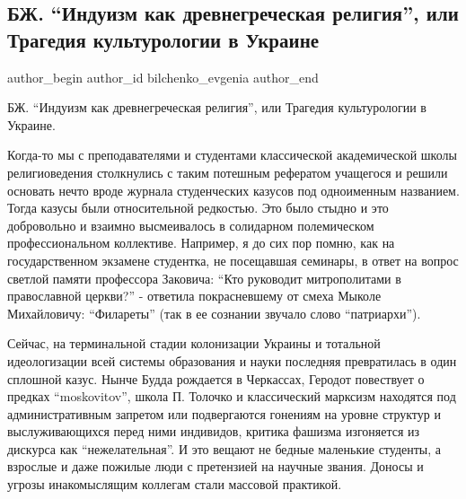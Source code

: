  
 
 
 
 
 
\subsection{БЖ. \enquote{Индуизм как древнегреческая религия}, или Трагедия культурологии в Украине}
\label{sec:28_12_2020.fb.bilchenko_evgenia.1.kulturologia_ukraina_tragedia}
\ifcmt
 author_begin
   author_id bilchenko_evgenia
 author_end
\fi

БЖ. \enquote{Индуизм как древнегреческая религия}, или Трагедия культурологии в Украине.

Когда-то мы с преподавателями и студентами классической академической школы
религиоведения столкнулись с таким потешным рефератом учащегося и решили
основать нечто вроде журнала студенческих казусов под одноименным названием.
Тогда казусы были относительной редкостью. Это было стыдно и это добровольно и
взаимно высмеивалось в солидарном полемическом профессиональном коллективе.
Например, я до сих пор помню, как на государственном экзамене студентка, не
посещавшая семинары, в ответ на вопрос светлой памяти профессора Заковича:
\enquote{Кто руководит митрополитами в православной церкви?} - ответила
покрасневшему от смеха Мыколе Михайловичу: \enquote{Филареты} (так в ее
сознании звучало слово \enquote{патриархи}). 

Сейчас, на терминальной стадии колонизации Украины и тотальной идеологизации
всей системы образования и науки последняя превратилась в один сплошной казус.
Нынче Будда рождается в Черкассах, Геродот повествует о предках \enquote{moskovitov},
школа П. Толочко и классический марксизм находятся под административным
запретом или подвергаются гонениям на уровне структур и выслуживающихся перед
ними индивидов, критика фашизма изгоняется из дискурса как \enquote{нежелательная}. И
это вещают не бедные маленькие студенты, а взрослые и даже пожилые люди с
претензией на научные звания. Доносы и угрозы инакомыслящим коллегам стали
массовой практикой.

